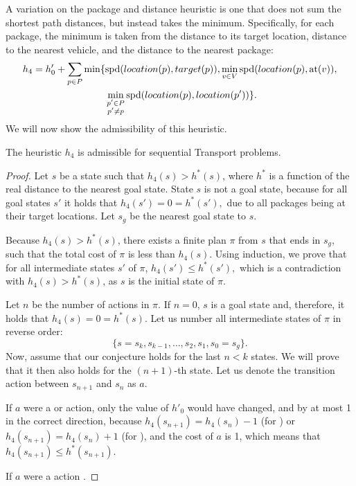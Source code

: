 A variation on the package and distance heuristic
is one that does not sum the shortest path distances, but instead takes
the minimum.
Specifically, for each package, the minimum
is taken from the distance to its target location,
distance to the nearest vehicle,
and the distance to the nearest package:
\begin{align*}
h_4 = h'_0 + \sum_{p \in P} \min\lbrace
&\textrm{spd}(location(p), target(p)),
\min_{v \in V} \textrm{spd}(location(p), \textrm{at}(v)),\\
&\min_{\substack{p' \in P\\p' \neq p}} \textrm{spd}(location(p), location(p'))\rbrace.
\end{align*}
We will now show the admissibility of this heuristic.
\begin{thm}
The heuristic $h_4$ is admissible for sequential Transport problems.
\end{thm}
\begin{proof}
Let $s$ be a state such that $h_4(s) > h^*(s)$,
where $h^*$ is a function of the real distance to the nearest goal state.
State $s$ is not a goal state, because for all goal states $s'$
it holds that
$h_4(s') = 0 = h^*(s'),$ due to all packages being at their target locations.
Let $s_g$ be the nearest goal state to $s$.

Because $h_4(s) > h^*(s)$, there exists a finite plan $\pi$ from $s$ that ends in $s_g$,
such that the total cost of $\pi$ is less than $h_4(s)$.
Using induction, we prove that for all intermediate states $s'$ of $\pi$,
$h_4(s') \leq h^*(s'),$ which is a contradiction with $h_4(s) > h^*(s)$,
as $s$ is the initial state of $\pi$.

Let $n$ be the number of actions in $\pi$.
If $n=0$, $s$ is a goal state and, therefore,
it holds that $h_4(s) = 0 = h^*(s)$.
Let us number all intermediate states of $\pi$ in reverse order: $$\{s = s_k, s_{k-1}, \ldots, s_2, s_1, s_0 = s_g\}.$$
Now, assume that our conjecture holds for the last $n < k$ states.
We will prove that it then also holds for the $(n+1)$-th state.
Let us denote the transition action between $s_{n+1}$ and $s_{n}$ as $a$.

If $a$ were a \pickup{} or \drop{} action, only the value of $h'_0$
would have changed, and by at most 1 in the correct direction,
because $h_4(s_{n+1}) = h_4(s_{n}) - 1$ (for \drop{})
or $h_4(s_{n+1}) = h_4(s_{n}) + 1$ (for \pickup{}), and the cost of $a$ is 1,
which means that $h_4(s_{n+1}) \leq h^*(s_{n+1}).$


If $a$ were a \drive{} action
.
\end{proof}

